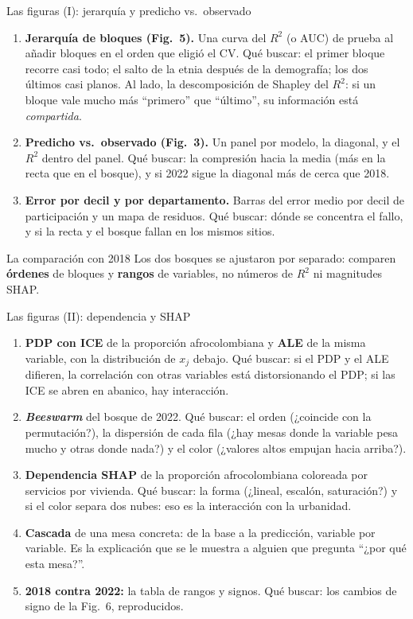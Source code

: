 \documentclass{beamer}
\newcommand{\1}{\mathbb{I}}
\begin{document}
\begin{frame}{Las figuras (I): jerarquía y predicho vs.\ observado}
\small
\begin{enumerate}\itemsep4pt
  \item \textbf{Jerarquía de bloques (Fig.\ 5).} Una curva del $R^2$ (o AUC) de prueba al añadir bloques en el orden que eligió el CV. Qué buscar: el primer bloque recorre casi todo; el salto de la etnia después de la demografía; los dos últimos casi planos. Al lado, la descomposición de Shapley del $R^2$: si un bloque vale mucho más ``primero'' que ``último'', su información está \emph{compartida}. \pause
  \item \textbf{Predicho vs.\ observado (Fig.\ 3).} Un panel por modelo, la diagonal, y el $R^2$ dentro del panel. Qué buscar: la compresión hacia la media (más en la recta que en el bosque), y si 2022 sigue la diagonal más de cerca que 2018. \pause
  \item \textbf{Error por decil y por departamento.} Barras del error medio por decil de participación y un mapa de residuos. Qué buscar: dónde se concentra el fallo, y si la recta y el bosque fallan en los mismos sitios.
\end{enumerate}
\pause
\begin{block}{La comparación con 2018}
Los dos bosques se ajustaron por separado: comparen \textbf{órdenes} de bloques y \textbf{rangos} de variables, no números de $R^2$ ni magnitudes SHAP.
\end{block}
\end{frame}

\begin{frame}{Las figuras (II): dependencia y SHAP}
\small
\begin{enumerate}\itemsep4pt
  \item \textbf{PDP con ICE} de la proporción afrocolombiana y \textbf{ALE} de la misma variable, con la distribución de $x_j$ debajo. Qué buscar: si el PDP y el ALE difieren, la correlación con otras variables está distorsionando el PDP; si las ICE se abren en abanico, hay interacción. \pause
  \item \textbf{\emph{Beeswarm}} del bosque de 2022. Qué buscar: el orden (¿coincide con la permutación?), la dispersión de cada fila (¿hay mesas donde la variable pesa mucho y otras donde nada?) y el color (¿valores altos empujan hacia arriba?). \pause
  \item \textbf{Dependencia SHAP} de la proporción afrocolombiana coloreada por servicios por vivienda. Qué buscar: la forma (¿lineal, escalón, saturación?) y si el color separa dos nubes: eso es la interacción con la urbanidad. \pause
  \item \textbf{Cascada} de una mesa concreta: de la base a la predicción, variable por variable. Es la explicación que se le muestra a alguien que pregunta ``¿por qué esta mesa?''. \pause
  \item \textbf{2018 contra 2022:} la tabla de rangos y signos. Qué buscar: los cambios de signo de la Fig.\ 6, reproducidos.
\end{enumerate}
\end{frame}
\end{document}
